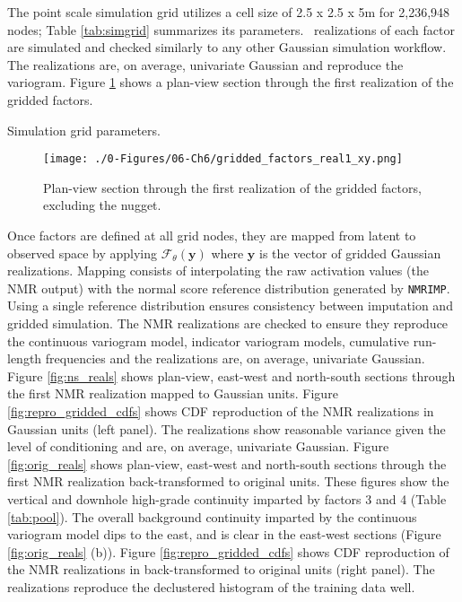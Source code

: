 The point scale simulation grid utilizes a cell size of 2.5 x 2.5 x 5m for 2,236,948 nodes; Table \ref{tab:simgrid} summarizes its parameters. \csnreals \ realizations of each factor are simulated and checked similarly to any other Gaussian simulation workflow. The realizations are, on average, univariate Gaussian and reproduce the variogram. Figure \ref{fig:gridded_factors} shows a plan-view section through the first realization of the gridded factors.

\begin{table}[!htb]
    \centering
    \caption{Simulation grid parameters.}
    \resizebox{0.9\width}{!}{}
    \label{tab:simgrid}
\end{table}

\begin{figure}[htb!]
    \centering
    \texttt{[image: ./0-Figures/06-Ch6/gridded\_factors\_real1\_xy.png]}
    \caption{Plan-view section through the first realization of the gridded factors, excluding the nugget.}
    \label{fig:gridded_factors}
\end{figure}

Once factors are defined at all grid nodes, they are mapped from latent to observed space by applying $\mathcal{F}_{\theta}(\mathbf{y})$ where $\mathbf{y}$ is the vector of gridded Gaussian realizations. Mapping consists of interpolating the raw activation values (the \gls{NMR} output) with the normal score reference distribution generated by \texttt{NMRIMP}. Using a single reference distribution ensures consistency between imputation and gridded simulation. The \gls{NMR} realizations are checked to ensure they reproduce the continuous variogram model, indicator variogram models, cumulative run-length frequencies and the realizations are, on average, univariate Gaussian. Figure \ref{fig:ns_reals} shows plan-view, east-west and north-south sections through the first \gls{NMR} realization mapped to Gaussian units. Figure \ref{fig:repro_gridded_cdfs} shows \gls{CDF} reproduction of the \gls{NMR} realizations in Gaussian units (left panel). The realizations show reasonable variance given the level of conditioning and are, on average, univariate Gaussian. Figure \ref{fig:orig_reals} shows plan-view, east-west and north-south sections through the first \gls{NMR} realization back-transformed to original units. These figures show the vertical and downhole high-grade continuity imparted by factors 3 and 4 (Table \ref{tab:pool}). The overall background continuity  imparted by the continuous variogram model dips to the east, and is clear in the east-west sections (Figure \ref{fig:orig_reals} (b)). Figure \ref{fig:repro_gridded_cdfs} shows \gls{CDF} reproduction of the \gls{NMR} realizations in back-transformed to original units (right panel). The realizations reproduce the declustered histogram of the training data well.

